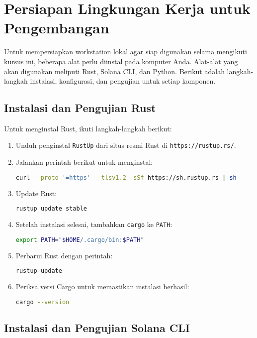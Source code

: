 

\chapter{Persiapan Lingkungan Kerja untuk Pengembangan}


Untuk mempersiapkan workstation lokal agar siap digunakan selama mengikuti kursus ini, beberapa alat perlu diinstal pada komputer Anda. Alat-alat yang akan digunakan meliputi Rust, Solana CLI, dan Python. Berikut adalah langkah-langkah instalasi, konfigurasi, dan pengujian untuk setiap komponen.

\section{Instalasi dan Pengujian Rust}

Untuk menginstal Rust, ikuti langkah-langkah berikut:
\begin{enumerate}
\item Unduh penginstal \texttt{RustUp} dari situs resmi Rust di \texttt{https://rustup.rs/}.
\item Jalankan perintah berikut untuk menginstal:
\begin{lstlisting}[language=bash]
curl --proto '=https' --tlsv1.2 -sSf https://sh.rustup.rs | sh
\end{lstlisting}

\item Update Rust:
\begin{lstlisting}[language=bash]
	rustup update stable
\end{lstlisting}

\item Setelah instalasi selesai, tambahkan \texttt{cargo} ke \texttt{PATH}:
\begin{lstlisting}[language=bash]
export PATH="$HOME/.cargo/bin:$PATH"
\end{lstlisting}
\item Perbarui Rust dengan perintah:
\begin{lstlisting}[language=bash]
rustup update
\end{lstlisting}
\item Periksa versi Cargo untuk memastikan instalasi berhasil:
\begin{lstlisting}[language=bash]
cargo --version
\end{lstlisting}
\end{enumerate}

\section{Instalasi dan Pengujian Solana CLI}

